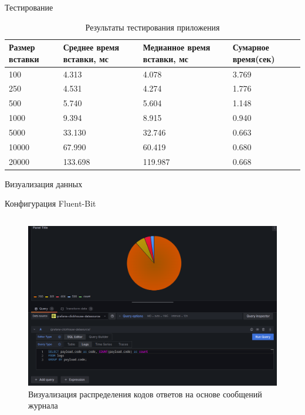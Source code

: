 \documentclass{beamer}
\begin{document}
\begin{frame}{Тестирование}
	\begin{table}[H]
		\caption{\centering Результаты тестирования приложения}
		\centering
		\begin{tabularx}{\textwidth}{|X|X|X|l|}
			\hline
			\textbf{Размер вставки} & \textbf{Среднее время вставки, мс} & \textbf{Медианное время вставки, мс} & \textbf{Сумарное время(сек)} \\ \hline
			100                     & 4.313                              & 4.078                                & 3.769                        \\ \hline
			250                     & 4.531                              & 4.274                                & 1.776                        \\ \hline
			500                     & 5.740                              & 5.604                                & 1.148                        \\ \hline
			1000                    & 9.394                              & 8.915                                & 0.940                        \\ \hline
			5000                    & 33.130                             & 32.746                               & 0.663                        \\ \hline
			10000                   & 67.990                             & 60.419                               & 0.680                        \\ \hline
			20000                   & 133.698                            & 119.987                              & 0.668                        \\ \hline
		\end{tabularx}
	\end{table}
\end{frame}


\begin{frame}{Визуализация данных}
	\begin{listing}[H]
		\caption{Конфигурация Fluent-Bit}
		\inputminted[style=bw, frame=single,fontsize = \small, linenos=true, xleftmargin = 1.5em, breaklines=true]{sql}{./listings/codes.sql}
	\end{listing}
	\begin{figure}[H]
		\centering
		\includegraphics[width=.5\textwidth]{./imgs/nginx_grafana_status_codes.png}
		\caption{Визуализация распределения кодов ответов на основе сообщений журнала}
	\end{figure}

\end{frame}
\end{document}
